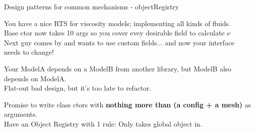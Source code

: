 \begin{frame}[fragile]{Design patterns for common mechanisms - objectRegistry}

\begin{description}
    \item[Scenario 1\hspace{2cm}] \hspace{\linewidth}
        You have a nice RTS for viscosity models; implementing all kinds of fluids.\\
        Base ctor now takes 10 args so you cover evey desirable field to calculate $\nu$\\
        Next guy comes by and wants to use custom fields... and now your interface needs to change!\\
    \item[Scenario 2\hspace{2cm}] \hspace{\linewidth}
        Your ModelA depends on a ModelB from another library, but ModelB also depends on ModelA.\\
        Flat-out bad design, but it's too late to refactor.\\
    \item<2>[Solution\hspace{2cm}] \hspace{\linewidth}
        Promise to write class ctors with {\bf nothing more than (a config + a mesh)} as arguments.\\ 
        Have an Object Registry with 1 rule: Only takes global object in.\\
\end{description}

\end{frame}

